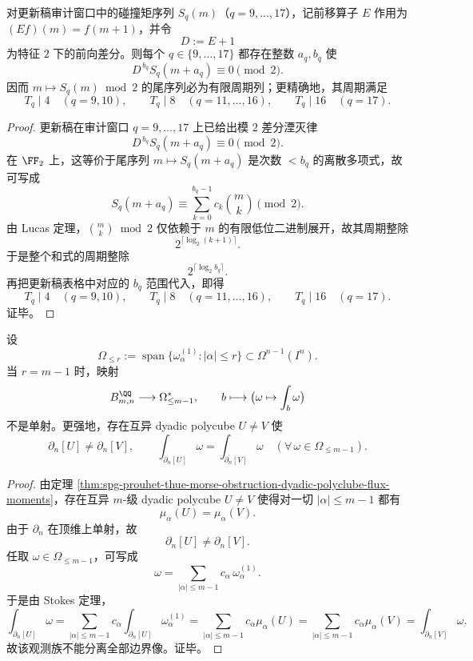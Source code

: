 \begin{proposition}[高阶碰撞矩奇偶影子的有限状态崩缩]\label{prop:conclusion-high-collision-moment-mod2-finite-state-collapse}
对更新稿审计窗口中的碰撞矩序列 \(S_q(m)\)（\(q=9,\dots,17\)），记前移算子 \(E\) 作用为 \((Ef)(m)=f(m+1)\)，并令
\[
D:=E+1
\]
为特征 \(2\) 下的前向差分。则每个 \(q\in\{9,\dots,17\}\) 都存在整数 \(a_q,b_q\) 使
\[
D^{\,b_q}S_q(m+a_q)\equiv 0 \pmod 2.
\]
因而 \(m\mapsto S_q(m)\bmod 2\) 的尾序列必为有限周期列；更精确地，其周期满足
\[
T_q\mid 4 \quad(q=9,10),\qquad
T_q\mid 8 \quad(q=11,\dots,16),\qquad
T_q\mid 16 \quad(q=17).
\]
\end{proposition}

\begin{proof}
更新稿在审计窗口 \(q=9,\dots,17\) 上已给出模 \(2\) 差分湮灭律
\[
D^{\,b_q}S_q(m+a_q)\equiv 0\pmod 2.
\]
在 \(\FF_2\) 上，这等价于尾序列 \(m\mapsto S_q(m+a_q)\) 是次数 \(<b_q\) 的离散多项式，故可写成
\[
S_q(m+a_q)\equiv \sum_{k=0}^{b_q-1} c_k\binom{m}{k}\pmod 2.
\]
由 Lucas 定理，\(\binom{m}{k}\bmod 2\) 仅依赖于 \(m\) 的有限低位二进制展开，故其周期整除
\[
2^{\lceil \log_2(k+1)\rceil}.
\]
于是整个和式的周期整除
\[
2^{\lceil \log_2 b_q\rceil}.
\]
再把更新稿表格中对应的 \(b_q\) 范围代入，即得
\[
T_q\mid 4 \quad(q=9,10),\qquad
T_q\mid 8 \quad(q=11,\dots,16),\qquad
T_q\mid 16 \quad(q=17).
\]
证毕。
\end{proof}

\begin{theorem}\label{thm:conclusion-low-total-degree-stokes-family-nonseparation}
设
\[
\Omega_{\le r}:=\operatorname{span}\{\omega^{(1)}_{\alpha}:|\alpha|\le r\}\subset \Omega^{n-1}(I^n).
\]
当 \(r=m-1\) 时，映射
\[
B_{m,n}^{\QQ}\longrightarrow \Omega_{\le m-1}^{\ast},
\qquad
b\longmapsto \bigl(\omega\mapsto \int_b\omega\bigr)
\]
不是单射。更强地，存在互异 dyadic polycube \(U\neq V\) 使
\[
\partial_n[U]\neq \partial_n[V],
\qquad
\int_{\partial_n[U]}\omega=\int_{\partial_n[V]}\omega
\quad
(\forall\,\omega\in\Omega_{\le m-1}).
\]
\end{theorem}

\begin{proof}
由定理 \ref{thm:spg-prouhet-thue-morse-obstruction-dyadic-polyclube-flux-moments}，存在互异 \(m\)-级 dyadic polycube \(U\neq V\) 使得对一切 \(|\alpha|\le m-1\) 都有
\[
\mu_\alpha(U)=\mu_\alpha(V).
\]
由于 \(\partial_n\) 在顶维上单射，故
\[
\partial_n[U]\neq \partial_n[V].
\]
任取 \(\omega\in\Omega_{\le m-1}\)，可写成
\[
\omega=\sum_{|\alpha|\le m-1} c_\alpha\,\omega^{(1)}_{\alpha}.
\]
于是由 Stokes 定理，
\[
\int_{\partial_n[U]}\omega
=
\sum_{|\alpha|\le m-1} c_\alpha \int_{\partial_n[U]}\omega^{(1)}_{\alpha}
=
\sum_{|\alpha|\le m-1} c_\alpha \mu_\alpha(U)
=
\sum_{|\alpha|\le m-1} c_\alpha \mu_\alpha(V)
=
\int_{\partial_n[V]}\omega.
\]
故该观测族不能分离全部边界像。证毕。
\end{proof}

